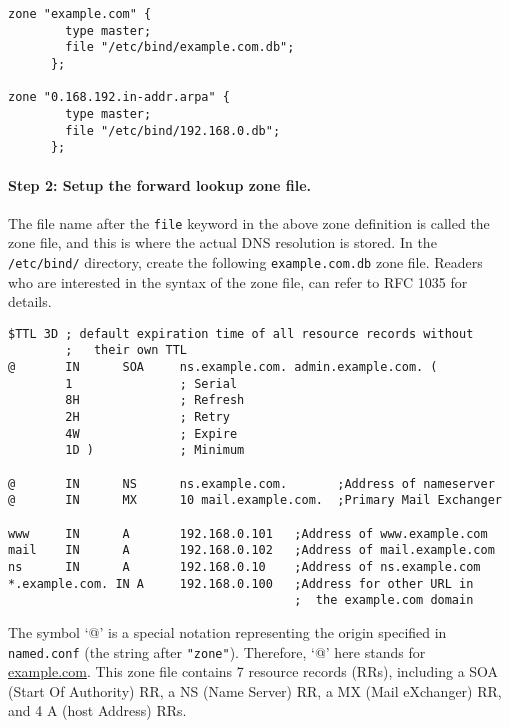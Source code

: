 \begin{lstlisting}
zone "example.com" {
        type master;
        file "/etc/bind/example.com.db";
      };

zone "0.168.192.in-addr.arpa" {
        type master;
        file "/etc/bind/192.168.0.db";
      };
\end{lstlisting}


\paragraph{Step 2: Setup the forward lookup zone file.}
The file name after the {\tt file} keyword in the above zone definition is called
the zone file, and this is where the actual DNS resolution is stored.
In the \texttt{/etc/bind/} directory, create the following
\texttt{example.com.db}
zone file. Readers who are interested in the syntax of the zone file,
can refer to RFC 1035 for details.

\vspace{0.2in}
\begin{lstlisting}
$TTL 3D ; default expiration time of all resource records without
        ;   their own TTL
@       IN      SOA     ns.example.com. admin.example.com. (
        1               ; Serial
        8H              ; Refresh
        2H              ; Retry
        4W              ; Expire
        1D )            ; Minimum

@       IN      NS      ns.example.com.       ;Address of nameserver
@       IN      MX      10 mail.example.com.  ;Primary Mail Exchanger

www     IN      A       192.168.0.101   ;Address of www.example.com
mail    IN      A       192.168.0.102   ;Address of mail.example.com
ns      IN      A       192.168.0.10    ;Address of ns.example.com
*.example.com. IN A     192.168.0.100   ;Address for other URL in
                                        ;  the example.com domain
\end{lstlisting}


The symbol `@' is a special notation representing the origin specified
in {\tt named.conf} (the string after \texttt{"zone"}).  Therefore,
`@' here stands for \url{example.com}.
This zone file contains 7 resource records (RRs), including
a SOA (Start Of Authority) RR, a
NS (Name Server) RR, a MX (Mail eXchanger) RR, and 4 A (host Address) RRs.


